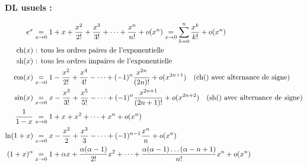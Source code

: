 \textbf{DL usuels :}

\begin{align*}
    e^x &\underset{x \rightarrow 0}{=} 1 + x + \dfrac{x^2}{2!} + \dfrac{x^3}{3!} + \dots + \dfrac{x^n}{n!} + o(x^n) \underset{x \rightarrow 0}{=} \sum_{k=0}^n \frac{x^k}{k!} + o(x^n)\\
    \operatorname{ch}(x) &\textrm{ : tous les ordres paires de l'exponentielle}\\
    \operatorname{sh}(x) & \textrm{ : tous les ordres impaires de l'exponentielle}\\
    \cos(x) &\underset{x \rightarrow 0}{=} 1 - \dfrac{x^2}{2!} + \dfrac{x^4}{4!} - \dots + (-1)^n \dfrac{x^{2n}}{(2n)!} + o(x^{2n+1}) \quad \textrm{(ch() avec alternance de signe)}\\
    \sin(x) &\underset{x \rightarrow 0}{=} x - \dfrac{x^3}{3!} + \dfrac{x^5}{5!} - \dots + (-1)^n \dfrac{x^{2n+1}}{(2n+1)!} + o(x^{2n+2}) \quad \textrm{(sh() avec alternance de signe)}\\
    \dfrac{1}{1 - x} &\underset{x \rightarrow 0}{=} 1 + x + x^2 + \dots + x^n + o(x^n)\\
    \ln(1 + x) &\underset{x \rightarrow 0}{=} x - \dfrac{x^2}{2} + \dfrac{x^3}{3} - \dots + (-1)^{n-1} \dfrac{x^n}{n} + o(x^n)\\
    (1+x)^\alpha &\underset{x \rightarrow 0}{=} 1 + \alpha x + \dfrac{\alpha(\alpha-1)}{2!} x^2 + \dots + \dfrac{\alpha(\alpha-1)\dots(\alpha-n+1)}{n!} x^n + o(x^n)\\
\end{align*}





